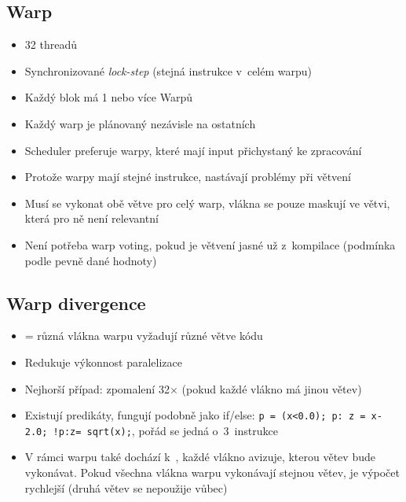 \subsection{Warp}
\begin{itemize}
    \item 32 threadů
    \item Synchronizované \textit{lock-step} (stejná instrukce v~celém warpu)
    \item Každý blok má 1 nebo více Warpů
    \item Každý warp je plánovaný nezávisle na ostatních
    \item Scheduler preferuje warpy, které mají input přichystaný ke zpracování
    \item Protože warpy mají stejné instrukce, nastávají problémy při větvení
    \item Musí se vykonat obě větve pro celý warp, vlákna se pouze maskují ve větvi, která pro ně není relevantní
    \item Není potřeba warp voting, pokud je větvení jasné už z~kompilace (podmínka podle pevně dané hodnoty)
\end{itemize}

\subsection{Warp divergence}
\begin{itemize}
    \item = různá vlákna warpu vyžadují různé větve kódu
    \item Redukuje výkonnost paralelizace
    \item Nejhorší případ: zpomalení 32\(\times\) (pokud každé vlákno má jinou větev)
    \item Existují predikáty, fungují podobně jako if/else: \texttt{p = (x<0.0); p: z = x-2.0; !p:z= sqrt(x);}, pořád se jedná o~3~instrukce
    \item V rámci warpu také dochází k~, každé vlákno avizuje, kterou větev bude vykonávat. Pokud všechna vlákna warpu vykonávají stejnou větev, je výpočet rychlejší (druhá větev se nepoužije vůbec)
\end{itemize}

